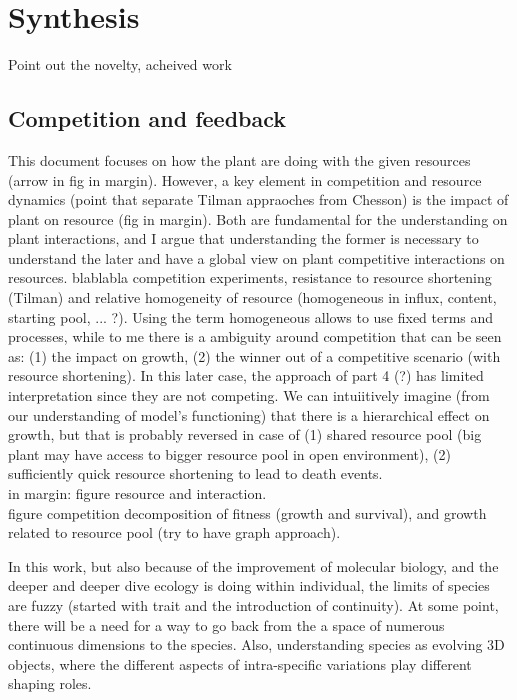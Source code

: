 

\chapter{Synthesis}

Point out the novelty, acheived work 


\section{Competition and feedback}
This document focuses on how the plant are doing with the given resources (arrow in fig in margin). However, a key element in competition and resource dynamics (point that separate Tilman appraoches from Chesson) is the impact of plant on resource (fig in margin). Both are fundamental for the understanding on plant interactions, and I argue that understanding the former is necessary to understand the later and have a global view on plant competitive interactions on resources. blablabla competition experiments, resistance to resource shortening (Tilman) and relative homogeneity of resource (homogeneous in influx, content, starting pool, ... ?). Using the term homogeneous allows to use fixed terms and processes, while to me there is a ambiguity around competition that can be seen as: (1) the impact on growth, (2) the winner out of a competitive scenario (with resource shortening). In this later case, the approach of part 4 (?) has limited interpretation since they are not competing. We can intuiitively imagine (from our understanding of model's functioning) that  there is a hierarchical effect on growth, but that is probably reversed in case of (1) shared resource pool (big plant may have access to bigger resource pool in open environment), (2) sufficiently quick resource shortening to lead to death events.\\

in margin: figure resource and interaction.\\
figure competition decomposition of fitness (growth and survival), and growth related to resource pool (try to have graph approach).


In this work, but also because of the improvement of molecular biology, and the deeper and deeper dive ecology is doing within individual, the limits of species are fuzzy (started with trait and the introduction of continuity). At some point, there will be a need for a way to go back from the a space of numerous continuous dimensions to the species. Also, understanding species as evolving 3D objects, where the different aspects of intra-specific variations play different shaping roles.